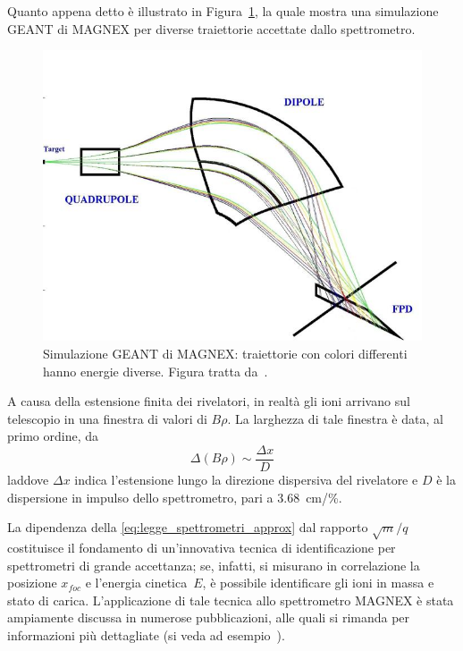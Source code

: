 Quanto appena detto è illustrato in Figura~\ref{fig:magnex_diverse_traiettorie}, la quale mostra una simulazione GEANT di MAGNEX per diverse traiettorie accettate dallo spettrometro.
\begin{figure} [!t]
	\centering
	\includegraphics[width=\textwidth, keepaspectratio]{Grafici/magnex_traiettorie_diverse.png}
	\caption{Simulazione GEANT di MAGNEX: traiettorie con colori differenti hanno energie diverse. Figura tratta da~\cite{cappuzzello:epja16}.} \label{fig:magnex_diverse_traiettorie}
\end{figure}



A causa della estensione finita dei rivelatori, in realtà gli ioni arrivano sul telescopio in una finestra di valori di $B \rho$. La larghezza di tale finestra è data, al primo ordine, da
\begin{equation}
	\Delta \left(B \rho \right) \sim \frac{\Delta x}{D}
\end{equation}
laddove $\Delta x$ indica l'estensione lungo la direzione dispersiva del rivelatore e $D$ è la dispersione in impulso dello spettrometro, pari a 3.68~cm/\%.

La dipendenza della \ref{eq:legge_spettrometri_approx} dal rapporto $\sqrt{m}/q$ costituisce il fondamento di un'innovativa tecnica di identificazione per spettrometri di grande accettanza; se, infatti, si misurano in correlazione la posizione $x_{foc}$ e l'energia cinetica~$E$, è possibile identificare gli ioni in massa e stato di carica.
L'applicazione di tale tecnica allo spettrometro MAGNEX è stata ampiamente discussa in numerose pubblicazioni, alle quali si rimanda per informazioni più dettagliate (si veda ad esempio~\cite{cappuzzello:nima10}). 

